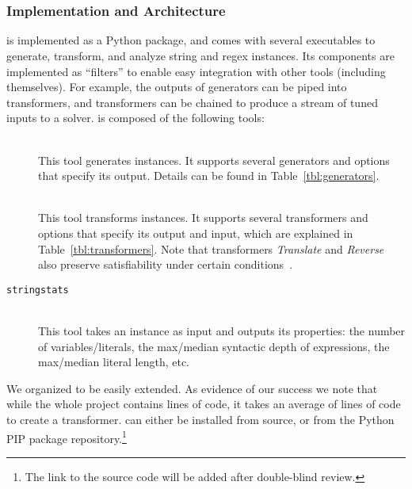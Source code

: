 \section{\fuzzer{}}
\label{sec:fuzzer}

\subsubsection{Implementation and Architecture}

\fuzzer{} is implemented as a Python package, and comes with several
executables to generate, transform, and analyze \smtfull{} string and regex
instances. Its components are implemented as \unix{} ``filters'' to enable easy
integration with other tools (including themselves). For example, the
outputs of generators can be piped into transformers, and transformers
can be chained to produce a stream of tuned inputs to a
solver. \fuzzer{} is composed of the following tools:
\begin{description}
    \item[\generator{}] \hfill \\
    This tool generates \smt{} instances. It supports several generators and
    options that specify its output. Details can be found in
    Table~\ref{tbl:generators}.
    \item[\transformer{}] \hfill \\
    This tool transforms \smt{}
    instances. It supports several transformers and options that specify
    its output and input, which are explained in
    Table~\ref{tbl:transformers}. Note that transformers
    \textit{Translate} and \textit{Reverse} also preserve
    satisfiability under certain conditions~\cite{ifaz}.
    \item[\texttt{stringstats}] \hfill \\
    This tool takes an \smt{}
    instance as input and outputs its properties: the number of
    variables/literals, the max/median syntactic depth of expressions, the
    max/median literal length, etc.
\end{description}
We organized \fuzzer{} to be easily extended. As evidence of our success we note
that while the whole project 
contains \linesInFuzzer{} lines of code, it takes an average of 
\linesPerX{} lines of code to create a transformer. \fuzzer{} can either be 
installed from source, or from the Python PIP package
repository.\footnote{The link to the source code will be added after double-blind review.}

